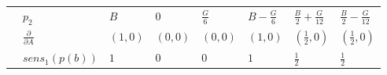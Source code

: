 \begin{tabular}{|l|l|l|l|l|l|l|l|}
& \small $p_2$ & \small $ \displaystyle B$& \small $ \displaystyle 0$& \small $ \displaystyle \frac{G}{6}$& \small $ \displaystyle B - \frac{G}{6}$& \small $ \displaystyle \frac{B}{2} + \frac{G}{12}$& \small $ \displaystyle \frac{B}{2} - \frac{G}{12}$\\[5pt]
& \small $\frac{\partial}{\partial A}$ & \small $ \displaystyle \left( 1, 0\right) $& \small $ \displaystyle \left( 0, 0\right) $& \small $ \displaystyle \left( 0, 0\right) $& \small $ \displaystyle \left( 1, 0\right) $& \small $ \displaystyle \left( \frac{1}{2}, 0\right) $& \small $ \displaystyle \left( \frac{1}{2}, 0\right) $\\[5pt]
& \small $sens_1(p(b))$ & \small $ \displaystyle 1$& \small $ \displaystyle 0$& \small $ \displaystyle 0$& \small $ \displaystyle 1$& \small $ \displaystyle \frac{1}{2}$& \small $ \displaystyle \frac{1}{2}$\\[5pt]
\hline
\end{tabular}